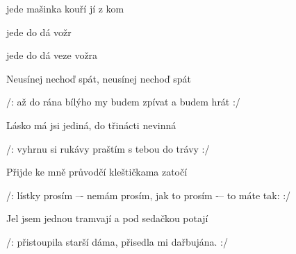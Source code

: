 

\zr
{} jede mašinka kouří  jí z kom

jede  do dá  vožr

jede  do dá {veze}  vožra
\kr

\zs
Neusínej nechoď spát, neusínej nechoď spát

/: až do rána bílýho my budem zpívat a budem hrát :/
\ks

\zs
Lásko má jsi jediná, do třinácti nevinná

/: vyhrnu si rukávy praštím s tebou do trávy :/
\ks

\zr  \kr

\zs
Přijde ke mně průvodčí kleštičkama zatočí

/: lístky prosím –- nemám prosím, jak to prosím -– to máte tak: :/
\ks

\zr  \kr

\zs
Jel jsem jednou tramvají a pod sedačkou potají

/: přistoupila starší dáma, přisedla mi dařbujána. :/
\ks

\zr  \kr

\kp






















